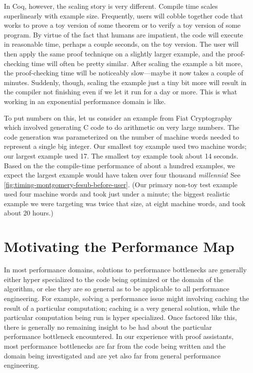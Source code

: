 In Coq, however, the scaling story is very different.
Compile time scales superlinearly with example size.
Frequently, users will cobble together code that works to prove a toy version of some theorem or to verify a toy version of some program.
By virtue of the fact that humans are impatient, the code will execute in reasonable time, perhaps a couple seconds, on the toy version.
The user will then apply the same proof technique on a slightly larger example, and the proof-checking time will often be pretty similar.
After scaling the example a bit more, the proof-checking time will be noticeably slow---maybe it now takes a couple of minutes.
Suddenly, though, scaling the example just a tiny bit more will result in the compiler not finishing even if we let it run for a day or more.
This is what working in an exponential performance domain is like.

To put numbers on this, let us consider an example from Fiat Cryptography which involved generating C code to do arithmetic on very large numbers.
The code generation was parameterized on the number of machine words needed to represent a single big integer.
Our smallest toy example used two machine words; our largest example used 17.
The smallest toy example took about 14 seconds.
Based on the the compile-time performance of about a hundred examples, we expect the largest example would have taken over four thousand \emph{millennia}!
See \autoref{fig:timing-montgomery-fesub-before-user}.
(Our primary non-toy test example used four machine words and took just under a minute; the biggest realistic example we were targeting was twice that size, at eight machine words, and took about 20 hours.)

\section{Motivating the Performance Map}%

In most performance domains, solutions to performance bottlenecks are generally either hyper specialized to the code being optimized or the domain of the algorithm, or else they are so general as to be applicable to all performance engineering.
For example, solving a performance issue might involving caching the result of a particular computation; caching is a very general solution, while the particular computation being run is hyper specialized.
Once factored like this, there is generally no remaining insight to be had about the particular performance bottleneck encountered.
In our experience with proof assistants, most performance bottlenecks are far from the code being written and the domain being investigated and are yet also far from general performance engineering.


